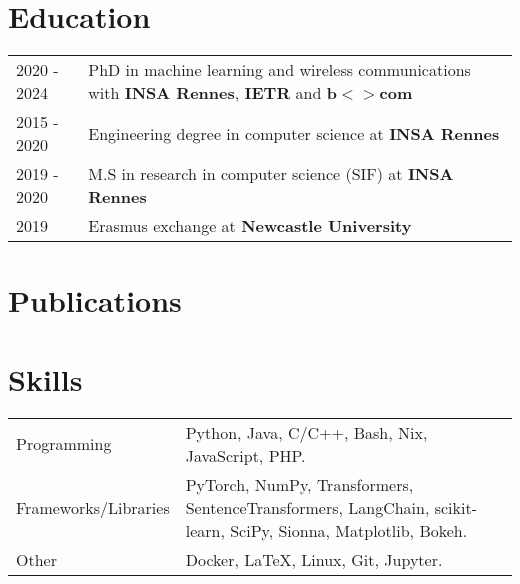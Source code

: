 \documentclass[a4paper,12pt]{article}
\begin{document}
\section{Education}
\begin{tabularx}{\linewidth}{@{}l X@{}}	
2020 - 2024 & PhD in machine learning and wireless communications with \textbf{INSA Rennes}, \textbf{IETR} and \textbf{b$<>$com} \\

2015 - 2020 & Engineering degree in computer science at \textbf{INSA Rennes}\\

2019 - 2020 & M.S in research in computer science (SIF) at \textbf{INSA Rennes}\\

2019 & Erasmus exchange at \textbf{Newcastle University}\\
\end{tabularx}

\section{Publications}
\begin{refsection}
\nocite{*}
\printbibliography[heading=none]
\end{refsection}

\section{Skills}
\begin{tabularx}{\linewidth}{@{}l X@{}}
Programming &  \normalsize{Python, Java, C/C++, Bash, Nix, JavaScript, PHP.}\\
Frameworks/Libraries &  \normalsize{PyTorch, NumPy, Transformers, SentenceTransformers, LangChain, scikit-learn, SciPy, Sionna, Matplotlib, Bokeh.}\\  
Other &  \normalsize{Docker, \LaTeX, Linux, Git, Jupyter.}
\end{tabularx}

\vfill
{}
\end{document}
